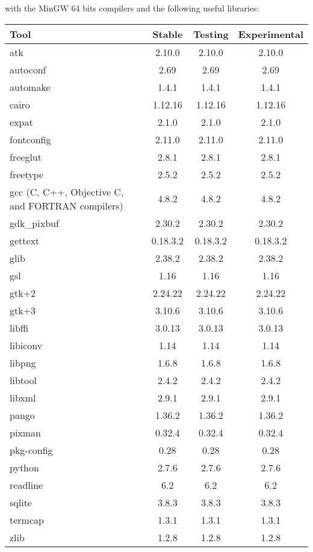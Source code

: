 \documentclass[a4paper]{article}
\begin{document}
with the MinGW 64 bits compilers and the following useful libraries:
\begin{tabular}{lccc}
Tool&Stable&Testing&Experimental\\
\hline
atk & 2.10.0 & 2.10.0 & 2.10.0\\
autoconf & 2.69 & 2.69 & 2.69\\
automake & 1.4.1 & 1.4.1 & 1.4.1\\
cairo & 1.12.16 & 1.12.16 & 1.12.16\\
expat & 2.1.0 & 2.1.0 & 2.1.0\\
fontconfig & 2.11.0 & 2.11.0 & 2.11.0\\
freeglut & 2.8.1 & 2.8.1 & 2.8.1\\
freetype & 2.5.2 & 2.5.2 & 2.5.2\\
gcc (C, C++, Objective C, and FORTRAN compilers) & 4.8.2  & 4.8.2  & 4.8.2\\
gdk\_pixbuf & 2.30.2 & 2.30.2 & 2.30.2\\
gettext & 0.18.3.2 & 0.18.3.2 & 0.18.3.2\\
glib & 2.38.2 & 2.38.2 & 2.38.2\\
gsl & 1.16 & 1.16 & 1.16\\
gtk+2 & 2.24.22 & 2.24.22 & 2.24.22\\
gtk+3 & 3.10.6 & 3.10.6 & 3.10.6\\
libffi & 3.0.13 & 3.0.13 & 3.0.13\\
libiconv & 1.14 & 1.14 & 1.14\\
libpng & 1.6.8 & 1.6.8 & 1.6.8\\
libtool & 2.4.2 & 2.4.2 & 2.4.2\\
libxml & 2.9.1 & 2.9.1 & 2.9.1\\
pango & 1.36.2 & 1.36.2 & 1.36.2\\
pixman & 0.32.4 & 0.32.4 & 0.32.4\\
pkg-config & 0.28 & 0.28 & 0.28\\
python & 2.7.6 & 2.7.6 & 2.7.6\\
readline & 6.2 & 6.2 & 6.2\\
sqlite & 3.8.3 & 3.8.3 & 3.8.3\\
termcap & 1.3.1 & 1.3.1 & 1.3.1\\
zlib & 1.2.8 & 1.2.8 & 1.2.8
\end{tabular}
\end{document}
